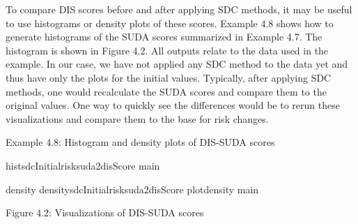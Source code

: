 \documentclass[letterpaper,10pt,english]{sphinxmanual}
\begin{document}
To compare DIS scores before and after applying SDC methods, it may be
useful to use histograms or density plots of these scores. Example 4.8
shows how to generate histograms of the SUDA scores summarized in
Example 4.7. The histogram is shown in Figure 4.2. All outputs relate to
the data used in the example. In our case, we have not applied any SDC
method to the data yet and thus have only the plots for the initial
values. Typically, after applying SDC methods, one would recalculate the
SUDA scores and compare them to the original values. One way to quickly
see the differences would be to rerun these visualizations and compare
them to the base for risk changes.

Example 4.8: Histogram and density plots of DIS-SUDA scores

%
\begin{sphinxVerbatim}[commandchars=\\\{\}]
histsdcInitialrisksuda2disScore main  

density  densitysdcInitialrisksuda2disScore
plotdensity main  
\end{sphinxVerbatim}


Figure 4.2: Visualizations of DIS-SUDA scores
\end{document}
